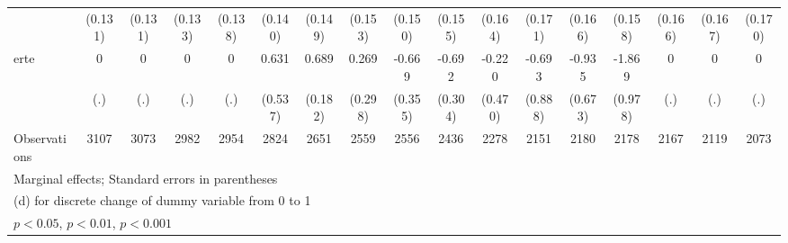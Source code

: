 {\begin{tabular}{l*{16}{c}}
                    &     (0.131)         &     (0.131)         &     (0.133)         &     (0.138)         &     (0.140)         &     (0.149)         &     (0.153)         &     (0.150)         &     (0.155)         &     (0.164)         &     (0.171)         &     (0.166)         &     (0.158)         &     (0.166)         &     (0.167)         &     (0.170)         \\
[1em]
erte                &           0         &           0         &           0         &           0         &       0.631         &       0.689\sym{***}&       0.269         &      -0.669         &      -0.692\sym{*}  &      -0.220         &      -0.693         &      -0.935         &      -1.869         &           0         &           0         &           0         \\
                    &         (.)         &         (.)         &         (.)         &         (.)         &     (0.537)         &     (0.182)         &     (0.298)         &     (0.355)         &     (0.304)         &     (0.470)         &     (0.888)         &     (0.673)         &     (0.978)         &         (.)         &         (.)         &         (.)         \\
\hline
Observations        &        3107         &        3073         &        2982         &        2954         &        2824         &        2651         &        2559         &        2556         &        2436         &        2278         &        2151         &        2180         &        2178         &        2167         &        2119         &        2073         \\
\hline\hline
\multicolumn{17}{l}{\footnotesize Marginal effects; Standard errors in parentheses}\\
\multicolumn{17}{l}{\footnotesize  (d) for discrete change of dummy variable from 0 to 1}\\
\multicolumn{17}{l}{\footnotesize \sym{*} \(p<0.05\), \sym{**} \(p<0.01\), \sym{***} \(p<0.001\)}\\
\end{tabular}
}
